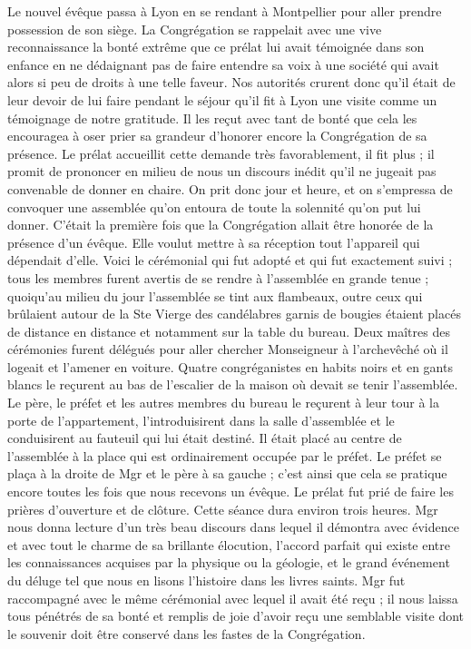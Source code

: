 Le nouvel évêque passa à Lyon en se rendant à Montpellier pour aller prendre possession de son siège. La Congrégation se rappelait avec une vive reconnaissance la bonté extrême que ce prélat lui avait témoignée dans son enfance en ne dédaignant pas de faire entendre sa voix à une société qui avait alors si peu de droits à une telle faveur. Nos autorités crurent donc qu'il était de leur devoir de lui faire pendant le séjour qu'il fit à Lyon une visite comme un témoignage de notre gratitude. Il les reçut avec tant de bonté que cela les encouragea à oser prier sa grandeur d'honorer encore la Congrégation de sa présence. Le prélat accueillit cette demande très favorablement, il fit plus ; il promit de prononcer en
milieu de nous un discours inédit qu'il ne jugeait pas convenable de donner en chaire. On prit donc jour et heure, et on s'empressa de convoquer une assemblée qu'on entoura de toute la solennité qu'on put lui donner. C'était la première fois que la Congrégation allait être honorée de la présence d'un évêque. Elle voulut mettre à sa réception tout l'appareil qui dépendait d'elle. Voici le cérémonial qui fut adopté et qui fut exactement suivi ; tous les membres furent avertis de se rendre à l'assemblée en grande tenue ; quoiqu'au milieu du jour l'assemblée se tint aux flambeaux, outre ceux qui brûlaient autour de la Ste Vierge des candélabres garnis de bougies étaient placés de distance en distance et notamment sur la table du bureau. Deux maîtres des cérémonies furent délégués pour aller chercher Monseigneur à l'archevêché où il logeait et l'amener en voiture. Quatre congréganistes en habits noirs et en gants blancs le reçurent au bas de l'escalier de la maison où devait se tenir l'assemblée. Le père, le préfet et les autres membres du bureau le reçurent à leur tour à la porte de l'appartement, l'introduisirent dans la salle d'assemblée et le conduisirent au fauteuil qui lui était destiné. Il était placé au centre de l'assemblée à la place qui est ordinairement occupée par le préfet. Le préfet se plaça à la droite de Mgr et le père à sa gauche ; c'est ainsi que cela se pratique encore toutes les fois que nous recevons un évêque. Le prélat fut prié de faire les prières d'ouverture et de clôture. Cette séance dura environ trois heures. Mgr nous donna lecture d'un très beau discours dans lequel il démontra avec évidence et avec tout le charme de sa brillante élocution, l'accord parfait qui existe entre les connaissances acquises par la physique ou la géologie,
et le grand événement du déluge tel que nous en lisons l'histoire dans les livres saints. Mgr fut raccompagné avec le même cérémonial avec lequel il avait été reçu ; il nous laissa tous pénétrés de sa bonté et remplis de joie d'avoir reçu une semblable visite dont le souvenir doit être conservé dans les fastes de la Congrégation.

